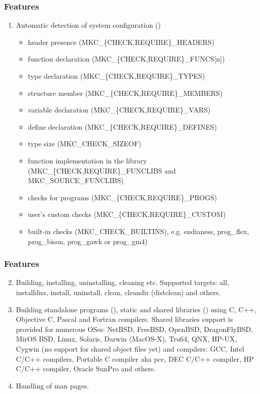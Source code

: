 \documentclass[hyperref={colorlinks=true}]{beamer}
\begin{document}
\begin{frame}[fragile]
  \frametitle{Features}
  \begin{block}{}
  \begin{enumerate}
  \item Automatic detection of system configuration
    ()
    \begin{itemize}
    \item header presence (MKC\_\{CHECK,REQUIRE\}\_HEADERS)
    \item function declaration (MKC\_\{CHECK,REQUIRE\}\_FUNCS[n])
    \item type declaration (MKC\_\{CHECK,REQUIRE\}\_TYPES)
    \item structure member (MKC\_\{CHECK,REQUIRE\}\_MEMBERS)
    \item variable declaration (MKC\_\{CHECK,REQUIRE\}\_VARS)
    \item define declaration (MKC\_\{CHECK,REQUIRE\}\_DEFINES)
    \item type size (MKC\_CHECK\_SIZEOF)
    \item function implementation in the library
      (MKC\_\{CHECK,REQUIRE\}\_FUNCLIBS and MKC\_SOURCE\_FUNCLIBS)
    \item checks for programs (MKC\_\{CHECK,REQUIRE\}\_PROGS)
    \item user's custom checks (MKC\_\{CHECK,REQUIRE\}\_CUSTOM)
    \item built-in checks (MKC\_CHECK\_BUILTINS), e.g. endianess,
      prog\_flex, prog\_bison, prog\_gawk or prog\_gm4)
    \end{itemize}
  \end{enumerate}
  \end{block}
\end{frame}

\begin{frame}[fragile,t]
  \frametitle{Features}
  \begin{block}{}
  \begin{enumerate}
  \setcounter{enumi}{1}
  \item Building, installing, uninstalling, cleaning
    etc. Supported targets: all, installdirs, install, uninstall,
    clean, cleandir (distclean) and others.
  \item Building standalone programs (),
    static and shared libraries () using C,
    C++, Objective C, Pascal and Fortran compilers. Shared libraries
    support is provided for numerous OSes: NetBSD, FreeBSD, OpenBSD,
    DragonFlyBSD, MirOS BSD, Linux, Solaris, Darwin (MacOS-X), Tru64,
    QNX, HP-UX, Cygwin (no support for shared object files yet) and
    compilers: GCC, Intel C/C++ compilers, Portable C compiler aka
    pcc, DEC C/C++ compiler, HP C/C++ compiler, Oracle SunPro and others.
  \item Handling of man pages.
  \end{enumerate}
  \end{block}
\end{frame}
\end{document}
